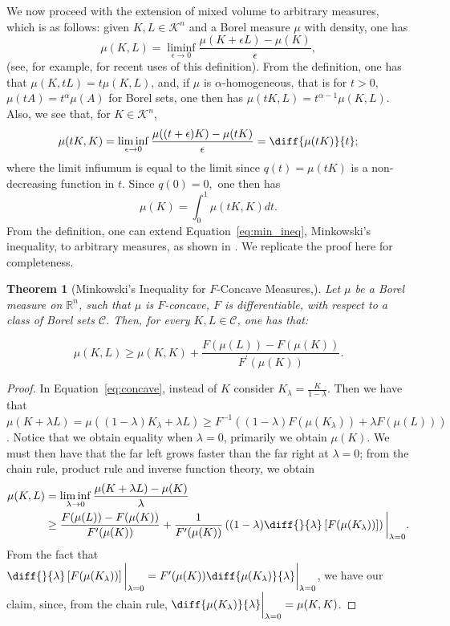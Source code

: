 \documentclass[11pt]{amsart}
\newtheorem{theorem}{Theorem}[section]
\theoremstyle{definition}
\theoremstyle{remark}
\numberwithin{equation}{section}
\newcommand{\R}{\mathbb{R}}
\newcommand{\conbod}{\mathcal{K}^n}
\begin{document}
	We now proceed with the extension of mixed volume to arbitrary measures, which is as follows: given $K,L\in\conbod$ and a Borel measure $\mu$ with density, one has
	\begin{equation}
	    \mu(K,L)=\liminf_{\epsilon\to0}\frac{\mu(K+\epsilon L)-\mu(K)}{\epsilon},
	    \label{eq:arb_mixed_0}
	\end{equation}
(see, for example, \cite{FLMZ23_1,FLMZ23_2,HJ21,LRZ22, GAL19, MR14} for recent uses of this definition). From the definition, one has that $\mu(K,tL)=t\mu(K,L)$, and, if $\mu$ is $\alpha$-homogeneous, that is for $t>0,$
	$\mu(tA)=t^\alpha\mu(A)$ for Borel sets, one then has $\mu(tK,L)=t^{\alpha-1}\mu(K,L).$
	Also, we see that, for $K\in\conbod$,
	$$\mu(tK,K)=\liminf_{\epsilon\to0}\frac{\mu((t+\epsilon)K)-\mu(tK)}{\epsilon}=\diff{\mu(tK)}{t};$$
	where the limit infiumum is equal to the limit since $q(t)=\mu(tK)$ is a non-decreasing function in $t.$ Since $q(0)=0,$ one then has
	\begin{equation}\mu(K)=\int_{0}^1\mu(tK,K)dt. \label{eq:int_meas}
	\end{equation}
	From the definition, one can extend Equation~\ref{eq:min_ineq}, Minkowski's inequality, to arbitrary measures, as shown in \cite{GAL19}. We replicate the proof here for completeness.
\begin{theorem}[Minkowski's Inequality for $F$-Concave Measures,\cite{GAL19}] 
	\label{t:min_eq}
	Let $\mu$ be a Borel measure on $\R^{n}$, such that $\mu$ is $F$-concave, $F$ is differentiable, with respect to a class of Borel sets $\mathcal{C}$. Then, for every $K,L\in\mathcal{C}$, one has that:

$$
\mu(K, L) \geq \mu(K, K)+\frac{F(\mu(L))-F(\mu(K))}{F^{\prime}(\mu(K))}.
$$
\end{theorem}
\begin{proof}
In Equation~\ref{eq:concave}, instead of $K$ consider $K_\lambda=\frac{K}{1-\lambda}$. Then we have that $\mu(K+\lambda L)=\mu((1-\lambda)K_\lambda+\lambda L) \geq F^{-1}\left((1-\lambda) F(\mu(K_\lambda)) +\lambda F(\mu(L))\right)$. Notice that we obtain equality when $\lambda=0$, primarily we obtain $\mu(K)$. We must then have that the far left grows faster than the far right at $\lambda=0$; from the chain rule, product rule and inverse function theory, we obtain
\begin{align*}\mu(K,L)&=\liminf_{\lambda \to 0}\frac{\mu(K+\lambda L)-\mu(K)}{\lambda}
\\
&\geq \frac{F(\mu(L))-F(\mu(K))}{F^{\prime}(\mu(K))}+\frac{1}{F^{\prime}(\mu(K))}\left((1-\lambda)\diff{}{\lambda}\left[F(\mu(K_\lambda))\right]\right)\bigg|_{\lambda=0}.\end{align*}
From the fact that $\diff{}{\lambda}\left[F(\mu(K_\lambda))\right]\bigg|_{\lambda =0}=F^{\prime}(\mu(K))\diff{\mu(K_\lambda)}{\lambda}\bigg|_{\lambda=0}$, we have our claim, since, from the chain rule, $\diff{\mu(K_\lambda)}{\lambda}\bigg|_{\lambda=0}=\mu(K,K)$.

\end{proof}
\end{document}
